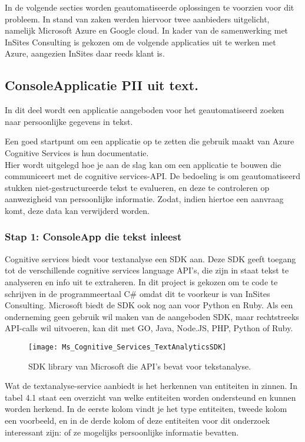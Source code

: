In de volgende secties worden geautomatiseerde oplossingen te voorzien voor dit probleem. 
In stand van zaken werden hiervoor twee aanbieders uitgelicht, namelijk Microsoft Azure en Google cloud. In kader van de samenwerking met InSites Consulting is gekozen om de volgende applicaties uit te werken met Azure, aangezien InSites daar reeds klant is.

\subsection{ConsoleApplicatie PII uit text.}
In dit deel wordt een applicatie aangeboden voor het geautomatiseerd zoeken naar persoonlijke gegevens in tekst. 

Een goed startpunt om een applicatie op te zetten die gebruik maakt van Azure Cognitive Services is hun documentatie. \textcite{Services2019} \\
Hier wordt uitgelegd hoe je aan de slag kan om een applicatie te bouwen die communiceert met de cognitive services-API. De bedoeling is om geautomatiseerd stukken niet-gestructureerde tekst te evalueren, en deze te controleren op aanwezigheid van  persoonlijke informatie. Zodat, indien hiertoe een aanvraag komt, deze data kan verwijderd worden. 

\subsubsection{Stap 1: ConsoleApp die tekst inleest}
Cognitive services biedt voor textanalyse een SDK aan.
 Deze SDK geeft toegang tot de verschillende cognitive services language API's, die zijn in staat tekst te analyseren en info uit te extraheren. In dit project is gekozen om te code te schrijven in de programmeertaal C\# omdat dit te voorkeur is van InSites Consulting. Microsoft biedt de SDK ook nog aan voor Python en Ruby. Als een onderneming geen gebruik wil maken van de aangeboden SDK, maar rechtstreeks API-calls wil uitvoeren, kan dit met GO, Java, Node.JS, PHP, Python of Ruby.\\

\begin{figure}[h]
	\centering
	\texttt{[image: Ms\_Cognitive\_Services\_TextAnalyticsSDK]}
	\label{fig:textanalyticsSDK}
	\caption{SDK library van Microsoft die API's bevat voor tekstanalyse.}
\end{figure}

Wat de textanalyse-service aanbiedt is het herkennen van entiteiten in zinnen. In tabel 4.1 staat een overzicht van welke entiteiten worden ondersteund en kunnen worden herkend. \textcite{Hill2019}
In de eerste kolom vindt je het type entiteiten, tweede kolom een voorbeeld, en in de derde kolom of deze entiteiten voor dit onderzoek interessant zijn: of ze mogelijks persoonlijke informatie bevatten. 

